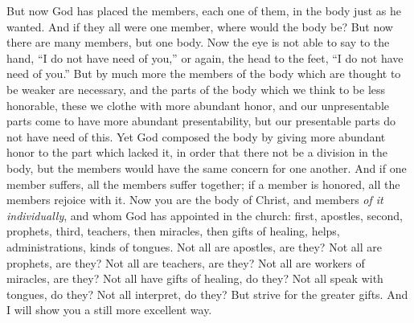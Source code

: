 \begin{biblechapter}
\verse But now God has placed the members, each one of them, in the body just as he wanted.
\verse And if they all were one member, where would the body be?
\verse But now there are many members, but one body.
\verse Now the eye is not able to say to the hand, “I do not have need of you,” or again, the head to the feet, “I do not have need of you.”
\verse But by much more the members of the body which are thought to be weaker are necessary,
\verse and the parts of the body which we think to be less honorable, these we clothe with more abundant honor, and our unpresentable parts come to have more abundant presentability,
\verse but our presentable parts do not have need of this. Yet God composed the body by giving more abundant honor to the part which lacked it,
\verse in order that there not be a division in the body, but the members would have the same concern for one another.
\verse And if one member suffers, all the members suffer together; if a member is honored, all the members rejoice with it.
\verse Now you are the body of Christ, and members \textit{of it individually},
\verse and whom God has appointed in the church: first, apostles, second, prophets, third, teachers, then miracles, then gifts of healing, helps, administrations, kinds of tongues.
\verse Not all are apostles, are they? Not all are prophets, are they? Not all are teachers, are they? Not all are workers of miracles, are they?
\verse Not all have gifts of healing, do they? Not all speak with tongues, do they? Not all interpret, do they?
\verse But strive for the greater gifts. And I will show you a still more excellent way.
\end{biblechapter}

